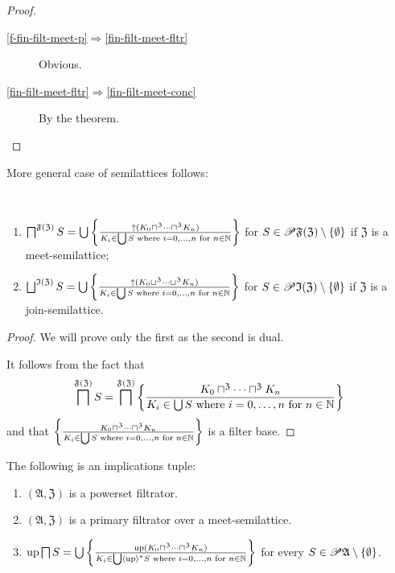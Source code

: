 \begin{proof}
~
\begin{description}
\item [{\ref{f-fin-filt-meet-p}$\Rightarrow$\ref{fin-filt-meet-fltr}}] Obvious.
\item [{\ref{fin-filt-meet-fltr}$\Rightarrow$\ref{fin-filt-meet-conc}}] By
the theorem.
\end{description}
\end{proof}
More general case of semilattices follows:
\begin{thm}
~
\begin{enumerate}
\item $\bigsqcap^{\mathfrak{F}(\mathfrak{Z})}S=\bigcup\left\{ \frac{\uparrow(K_{0}\sqcap^{\mathfrak{Z}}\dots\sqcap^{\mathfrak{Z}}K_{n})}{K_{i}\in\bigcup S\text{ where }i=0,\dots,n\text{ for }n\in\mathbb{N}}\right\}$
for $S\in\mathscr{P}\mathfrak{F}(\mathfrak{Z})\setminus\{\emptyset\}$
if $\mathfrak{Z}$ is a meet-semilattice;
\item $\bigsqcup^{\mathfrak{I}(\mathfrak{Z})}S=\bigcup\setcond{\uparrow(K_{0}\sqcup^{\mathfrak{Z}}\dots\sqcup^{\mathfrak{Z}}K_{n})}{K_{i}\in\bigcup S\text{ where }i=0,\dots,n\text{ for }n\in\mathbb{N}}$
for $S\in\mathscr{P}\mathfrak{I}(\mathfrak{Z})\setminus\{\emptyset\}$
if $\mathfrak{Z}$ is a join-semilattice.
\end{enumerate}
\end{thm}
\begin{proof}
We will prove only the first as the second is dual.

It follows from the fact that
\[
\bigsqcap^{\mathfrak{F}(\mathfrak{Z})}S=\bigsqcap^{\mathfrak{F}(\mathfrak{Z})}\left\{ \frac{K_{0}\sqcap^{\mathfrak{Z}}\dots\sqcap^{\mathfrak{Z}}K_{n}}{K_{i}\in\bigcup S\text{ where }i=0,\dots,n\text{ for }n\in\mathbb{N}}\right\}
\]
and that $\left\{ \frac{K_{0}\sqcap^{\mathfrak{Z}}\dots\sqcap^{\mathfrak{Z}}K_{n}}{K_{i}\in\bigcup S\text{ where }i=0,\dots,n\text{ for }n\in\mathbb{N}}\right\}$
is a filter base.\end{proof}
\begin{cor}
\label{meet-filtx}The following is an implications tuple:
\begin{enumerate}
\item $(\mathfrak{A},\mathfrak{Z})$ is a powerset filtrator.
\item $(\mathfrak{A},\mathfrak{Z})$ is a primary filtrator over a meet-semilattice.
\item $\operatorname{up}\bigsqcap S=\bigcup\left\{ \frac{\operatorname{up}(K_{0}\sqcap^{\mathfrak{Z}}\dots\sqcap^{\mathfrak{Z}}K_{n})}{K_{i}\in\bigcup\left\langle \operatorname{up}\right\rangle ^{\ast}S\text{ where }i=0,\dots,n\text{ for }n\in\mathbb{N}}\right\}$
for every $S\in\mathscr{P}\mathfrak{A}\setminus\{\emptyset\}$.
\end{enumerate}
\end{cor}
